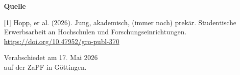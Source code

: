 \documentclass[DIV=calc]{scrartcl}
\begin{document}
\textbf{Quelle}

[1] %
Hopp, er al. (2026). Jung, akademisch, (immer noch) prekär. Studentische Erwerbsarbeit an Hochschulen und Forschungseinrichtungen. \url{https://doi.org/10.47952/gro-publ-370} 




\vspace{1cm} 
%
\vfill
\begin{flushright}
	Verabschiedet am 17. Mai 2026 \\
	auf der ZaPF in Göttingen.
\end{flushright}
\end{document}
